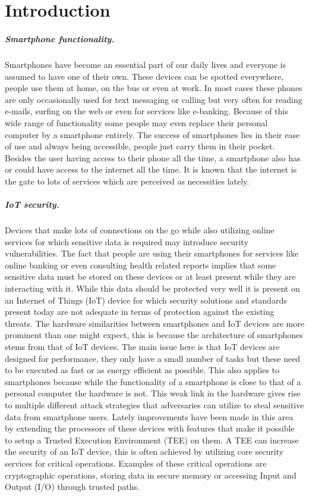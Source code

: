 \documentclass{report}
\begin{document}
\chapter{Introduction}

\paragraph*{Smartphone functionality.} 
Smartphones have become an essential part of our daily lives and everyone is assumed to have one of their own. These devices can be spotted everywhere, people use them at home, on the bus or even at work. In most cases these phones are only occasionally used for text messaging or calling but very often for reading e-mails, surfing on the web or even for services like e-banking. Because of this wide range of functionality some people may even replace their personal computer by a smartphone entirely. The success of smartphones lies in their ease of use and always being accessible, people just carry them in their pocket. Besides the user having access to their phone all the time, a smartphone also has or could have access to the internet all the time. It is known that the internet is the gate to lots of services which are perceived as necessities lately.

\paragraph*{IoT security.}
Devices that make lots of connections on the go while also utilizing online services for which sensitive data is required may introduce security vulnerabilities. The fact that people are using their smartphones for services like online banking or even consulting health related reports implies that some sensitive data must be stored on these devices or at least present while they are interacting with it. While this data should be protected very well it is present on an Internet of Things (IoT) device for which security solutions and standards present today are not adequate in terms of protection against the existing threats. The hardware similarities between smartphones and IoT devices are more prominent than one might expect, this is because the architecture of smartphones stems from that of IoT devices. The main issue here is that IoT devices are designed for performance, they only have a small number of tasks but these need to be executed as fast or as energy efficient as possible. This also applies to smartphones because while the functionality of a smartphone is close to that of a personal computer the hardware is not. This weak link in the hardware gives rise to multiple different attack strategies that adversaries can utilize to steal sensitive data from smartphone users. Lately improvements have been made in this area by extending the processors of these devices with features that make it possible to setup a Trusted Execution Environment (TEE) on them. A TEE can increase the security of an IoT device, this is often achieved by utilizing core security services for critical operations. Examples of these critical operations are cryptographic operations, storing data in secure memory or accessing Input and Output (I/O) through trusted paths.
\end{document}
